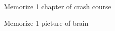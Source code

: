 \item \day
{}
\begin{todoList}
    \item[\first] {\color{red}Memorize} 1 chapter of crash course
    \item[\second] {\color{red}Memorize} 1 picture of brain
\end{todoList}